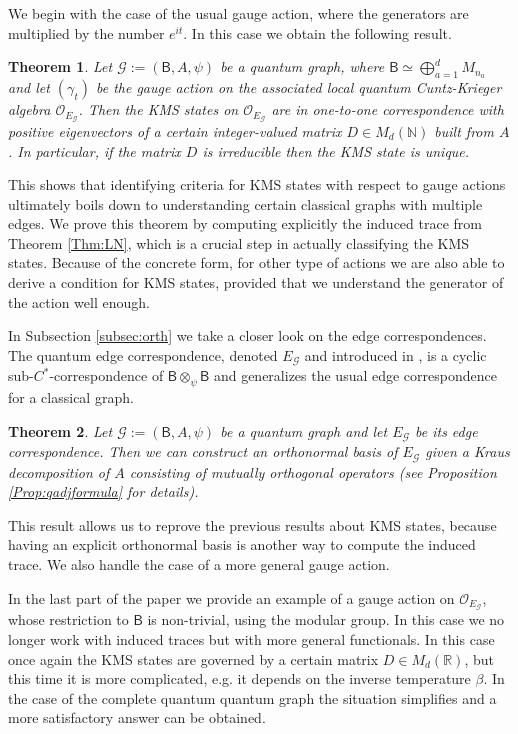 \documentclass[a4paper,reqno]{amsart}
\numberwithin{equation}{section}
\numberwithin{theorem}{section}
\newtheorem{introtheorem}{Theorem}
\theoremstyle{definition}\newtheorem{definition}[theorem]{Definition}
\theoremstyle{definition}\newtheorem{remark}[theorem]{Remark}
\theoremstyle{definition}\newtheorem{example}[theorem]{Example}
\theoremstyle{definition}\newtheorem*{notation*}{Notation}
\theoremstyle{definition}\newtheorem*{convention*}{Convention}
\theoremstyle{definition}\newtheorem{observation}{Observation}
\theoremstyle{definition}\newtheorem*{acknowledgment*}{Acknowledgments}
\newcommand{\B}{\mathsf{B}}
\newcommand{\G}{\mathcal{G}}
\newcommand{\cst}{C^*}
\begin{document}
We begin with the case of the usual gauge action, where the generators are multiplied by the number $e^{it}$.   In this case we obtain the following result.
\begin{introtheorem}
Let $\mathcal{G}:=(\B, A, \psi)$ be a quantum graph, where $\B\simeq \bigoplus_{a=1}^{d} M_{n_a}$ and let $(\gamma_t)$ be the gauge action on the associated local quantum Cuntz-Krieger algebra $\mathcal{O}_{E_{\mathcal{G}}}$. Then the KMS states on $\mathcal{O}_{E_{\mathcal{G}}}$ are in one-to-one correspondence with positive eigenvectors of a certain integer-valued matrix $D \in M_{d}(\mathbb{N})$ built from $A$. In particular, if the matrix $D$ is irreducible then the KMS state is unique.
\end{introtheorem}

This shows that identifying criteria for KMS states with respect to gauge actions ultimately boils down  to  understanding certain classical graphs with multiple edges.
We prove this theorem by computing explicitly the induced trace from Theorem \ref{Thm:LN}, which is a crucial step in actually classifying the KMS states. Because of the concrete form, for other type of actions we are also able to derive a condition for KMS states, provided that we understand the generator of the action well enough. 

In Subsection \ref{subsec:orth} we take a closer look on the edge correspondences. The quantum edge correspondence, denoted $E_\G$ and  introduced in \cite{BHINW},  is a cyclic sub-$\cst$-correspondence of $\B\otimes_\psi\B$ and generalizes the usual edge correspondence for a classical graph.
\begin{introtheorem}
Let $\mathcal{G}:=(\B, A, \psi)$ be a quantum graph and let $E_{\mathcal{G}}$ be its edge correspondence. Then we can construct an orthonormal basis of $E_{\mathcal{G}}$ given a Kraus decomposition of $A$ consisting of mutually orthogonal operators (see Proposition \ref{Prop:qadjformula} for details).    
\end{introtheorem}
This result allows us to reprove the previous results about KMS states, because having an explicit orthonormal basis is another way to compute the induced trace. We also handle the case of a more general gauge action.

In the last part of the paper we provide an example of a gauge action on $\mathcal{O}_{E_{\mathcal{G}}}$, whose restriction to $\B$ is non-trivial, using the modular group. In this case we no longer work with induced traces but with more general functionals. In this case once again the KMS states are governed by a certain matrix $D \in M_d(\mathbb{R})$, but this time it is more complicated, e.g. it depends on the inverse temperature $\beta$. In the case of the complete quantum quantum graph the situation simplifies and a more satisfactory answer can be obtained.
\end{document}
